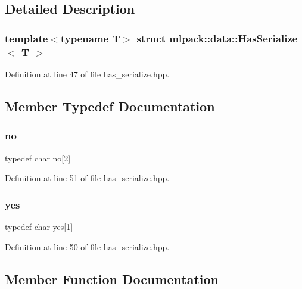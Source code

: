 \subsection{Detailed Description}
\subsubsection*{template$<$typename T$>$\newline
struct mlpack\+::data\+::\+Has\+Serialize$<$ T $>$}



Definition at line 47 of file has\+\_\+serialize.\+hpp.



\subsection{Member Typedef Documentation}
\mbox{\label{structmlpack_1_1data_1_1HasSerialize_a60b821c13604c22450353fa73865c3af}} 
\subsubsection{no}
{\footnotesize\ttfamily typedef char no[2]}



Definition at line 51 of file has\+\_\+serialize.\+hpp.

\mbox{\label{structmlpack_1_1data_1_1HasSerialize_a8d05d9e44de47fbffe6082ba732f35d3}} 
\subsubsection{yes}
{\footnotesize\ttfamily typedef char yes[1]}



Definition at line 50 of file has\+\_\+serialize.\+hpp.



\subsection{Member Function Documentation}
\mbox{\label{structmlpack_1_1data_1_1HasSerialize_ac27e1314a46e93ff63f509e1f2260841}} 
